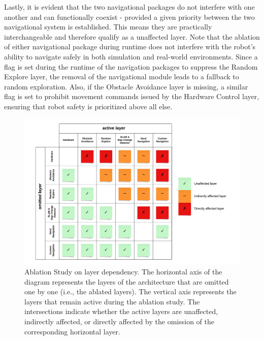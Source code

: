 \documentclass[%
paper=A4,               %
twoside=true,           %
openright,              %
11pt,                   %
bibliography=totoc,     %
titlepage=on,           %
DIV=12,                 %
BCOR=1.5cm,             %
parskip=half,            %
final
]{scrreprt}
\begin{document}
	Lastly, it is evident that the two navigational packages do not interfere with one another and can functionally coexist - provided a given priority between the two navigational system is established. This means they are practically interchangeable and therefore qualify as a unaffected layer. 
	Note that the ablation of either navigational package during runtime does not interfere with the robot's ability to navigate safely in both simulation and real-world environments. Since a flag is set during the runtime of the navigation packages to suppress the Random Explore layer, the removal of the navigational module leads to a fallback to random exploration. Also, if the Obstacle Avoidance layer is missing, a similar flag is set to prohibit movement commands issued by the Hardware Control layer, ensuring that robot safety is prioritized above all else.
	
	
	\begin{figure}[H]
		\centering
		\hspace*{1.5cm} %
		\includegraphics[width=1\textwidth]{Graphics/AblationStudy}
		\captionsetup{font=scriptsize, justification=centering}
		\caption{Ablation Study on layer dependency. The horizontal axis of the diagram represents the layers of the architecture that are omitted one by one (i.e., the ablated layers). The vertical axis represents the layers that remain active during the ablation study. The intersections indicate whether the active layers are unaffected, indirectly affected, or directly affected by the omission of the corresponding horizontal layer.}
		\label{fig: fig9}
	\end{figure}
	
\end{document}
